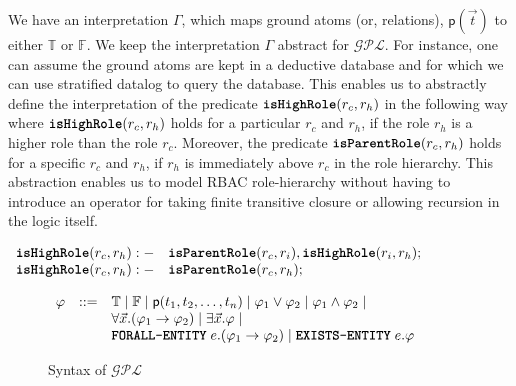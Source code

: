 \documentclass{sig-alternate}
\newcommand{\planguage}{\ensuremath{\mathbf{\mathcal{GPL}}}\xspace}
\newcommand{\funcname}[1]{\textbf{\texttt{#1}}}
\newcommand{\policy}{\ensuremath{\varphi}\xspace}
\newcommand{\true}{\ensuremath{\mathbb{T}}\xspace}
\newcommand{\false}{\ensuremath{\mathbb{F}}\xspace}
\newcommand{\pred}[1]{\ensuremath{\mathsf{#1}}\xspace}
\newcommand{\foralle}{\ensuremath{\funcname{FORALL-ENTITY}}\xspace}
\newcommand{\existse}{\ensuremath{\funcname{EXISTS-ENTITY}}\xspace}
\begin{document}
We have an interpretation $\Gamma$, which maps ground atoms (or, relations), $\pred{p}(\vec{t})$ to either \true or \false. 
We keep the interpretation $\Gamma$ abstract for \planguage. For instance, one can assume the ground atoms are 
kept in a deductive database and for which we can use stratified datalog to query the database. 
This enables us to abstractly define the interpretation of the predicate $\funcname{isHighRole}(r_c, r_h)$ 
in the following way where $\funcname{isHighRole}(r_c, r_h)$ holds for a particular $r_c$ and $r_h$, if 
the role $r_h$ is a higher role than the role $r_c$. Moreover, the predicate $\funcname{isParentRole}(r_c, r_h)$ holds 
for a specific $r_c$ and $r_h$, if $r_h$ is immediately above $r_c$ in the role hierarchy. This abstraction enables us 
to model RBAC role-hierarchy without having to introduce an operator for taking finite transitive closure or allowing 
recursion in the logic itself.

\noindent
\begin{small}
$
\begin{array}{ll}
\funcname{isHighRole}(r_c, r_h) :- &\funcname{isParentRole}(r_c, r_i),\funcname{isHighRole}(r_i, r_h) ;\\
\funcname{isHighRole}(r_c, r_h) :- &\funcname{isParentRole}(r_c, r_h) ;
\end{array}
$
\end{small}

\begin{figure}[t]
\centering
$
\begin{array}{lll}
\policy & ::= & \true \mid \false \mid \pred{p}(t_1, t_2, \ldots,t_n)\mid \policy_1\vee\policy_2 \mid \policy_1\wedge \policy_2 \mid\\
& & \forall\vec{x}.(\policy_1\rightarrow\policy_2) \mid \exists\vec{x}.\policy\mid\\
& & \foralle\;e.(\policy_1\rightarrow\policy_2)\mid \existse\;e.\policy
\end{array}
$
\caption{Syntax of \planguage}\label{fig:logic}
\end{figure}
\end{document}
